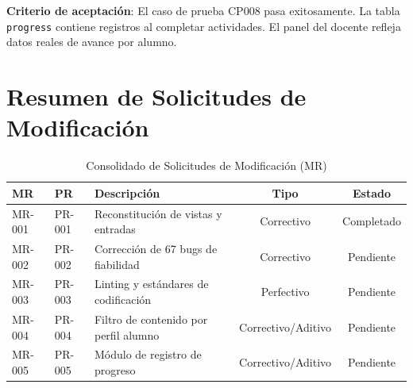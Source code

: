 \documentclass[12pt]{article}
\begin{document}
\textbf{Criterio de aceptación}: El caso de prueba CP008 pasa exitosamente.
La tabla \texttt{progress} contiene registros al completar actividades.
El panel del docente refleja datos reales de avance por alumno.

\section*{Resumen de Solicitudes de Modificación}

\begin{table}[H]
\centering
\caption{Consolidado de Solicitudes de Modificación (MR)}
\begin{tabularx}{\textwidth}{llXcc}
\toprule
\textbf{MR} & \textbf{PR} & \textbf{Descripción} & \textbf{Tipo} & \textbf{Estado} \\
\midrule
MR-001 & PR-001 & Reconstitución de vistas y entradas    & Correctivo          & Completado \\
MR-002 & PR-002 & Corrección de 67 bugs de fiabilidad    & Correctivo          & Pendiente  \\
MR-003 & PR-003 & Linting y estándares de codificación   & Perfectivo          & Pendiente  \\
MR-004 & PR-004 & Filtro de contenido por perfil alumno  & Correctivo/Aditivo  & Pendiente  \\
MR-005 & PR-005 & Módulo de registro de progreso         & Correctivo/Aditivo  & Pendiente  \\
\bottomrule
\end{tabularx}
\end{table}
\end{document}
